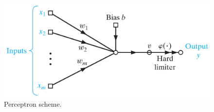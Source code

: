 \begin{figure}[!htb]
\centering
\includegraphics[width=.80\columnwidth]{images/064perceptron}
\caption[Perceptron scheme]{Perceptron scheme.}
\label{fig:064perceptron}
\end{figure}